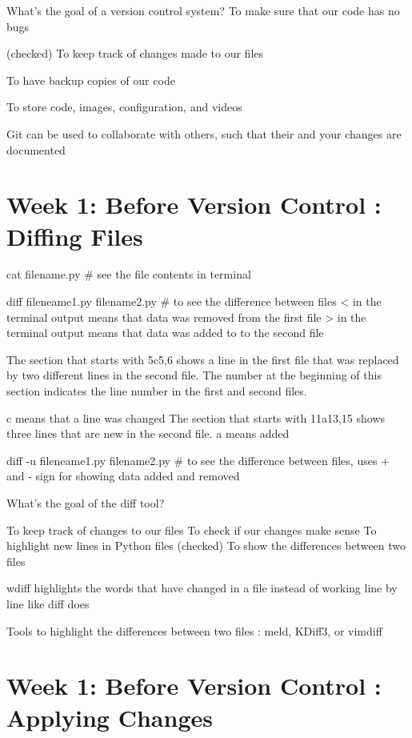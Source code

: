 \documentclass[11pt, onecolumn]{article}
\begin{document}
What’s the goal of a version control system?
To make sure that our code has no bugs

(checked) To keep track of changes made to our files

To have backup copies of our code

To store code, images, configuration, and videos
        
Git can be used to collaborate with others, such that their and your changes are documented



\section{Week 1: Before Version Control : Diffing Files}

cat filename.py    # see the file contents in terminal

diff fileneame1.py filename2.py  # to see the difference between files
< in the terminal output means that data was removed from the first file
> in the terminal output means that data was added to to the second file

The section that starts with 5c5,6 shows a line in the first file that was replaced by two different lines in the second file. The number at the beginning of this section indicates the line number in the first and second files.

c means that a line was changed
The section that starts with 11a13,15 shows three lines that are new in the second file.
a means added

diff -u fileneame1.py filename2.py  # to see the difference between files, uses + and - sign for showing data added and removed

What’s the goal of the diff tool?

To keep track of changes to our files
To check if our changes make sense
To highlight new lines in Python files
(checked) To show the differences between two files

wdiff highlights the words that have changed in a file instead of working line by line like diff does
    
Tools to highlight the differences between two files : meld, KDiff3, or vimdiff



\section{Week 1: Before Version Control : Applying Changes}
\end{document}
